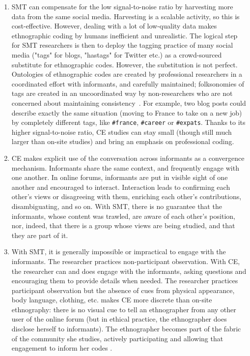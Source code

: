 \begin{enumerate}
\item SMT can compensate for the low signal-to-noise ratio by harvesting more data from the same social media. Harvesting is a scalable activity, so this is cost-effective. However, dealing with a lot of low-quality data makes ethnographic coding by humans inefficient and unrealistic. The logical step for SMT researchers is then to deploy the tagging practice of many social media ("tags" for blogs, "hastags" for Twitter etc.) as a crowd-sourced substitute for ethnographic codes. However, the substitution is not perfect. Ontologies of ethnographic codes are created by professional researchers in a coordinated effort with informants, and carefully maintained; folksonomies of tags are created in an uncoordinated way by non-researchers who are not concerned about maintaining consistency~\cite{Stilo2014}. For example, two blog posts could describe exactly the same situation (moving to France to take on a new job) by completely different tags, like \texttt{\#france}, \texttt{\#career} or \texttt{\#expats}. Thanks to its higher signal-to-noise ratio, CE studies can stay small (though still much larger than on-site studies) and bring an emphasis on professional coding. 

\item CE makes explicit use of the conversation across informants as a convergence mechanism. Informants share the same context, and frequently engage with one another. In online forums, informants are put in visible sight of one another and encouraged to interact. Interaction leads to confirming each other's views or disagreeing with them, enriching each other's contributions, disambiguating, and so on. With SMT, there is no guarantee that the informants, whose content was trawled, are aware of each other's position, nor, indeed, that there is a group whose views are being studied, and that they are part of it.

\item With SMT, it is generally impossible or impractical to engage with the informants. The researcher practices non-participant observation. With CE, the researcher can and does engage with the informants, asking questions and encouraging them to provide details when needed. The researcher practices participant observation but the absence of cues from physical appearance, body language, clothing, etc. makes CE more discrete than on-site ethnography: there is no visual cue to tell an ethnographer from any other user of the online forum (but in ethical practice, the ethnographer does disclose herself to informants). The ethnographer becomes part of the fabric of the community she studies, actively participating and allowing that engagement to inform her codes \cite{Goffman1989,Emerson2011}.


\end{enumerate}
